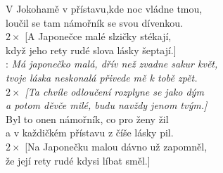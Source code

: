 
V Jokohamě v přístavu,kde noc vládne tmou,\\
loučil se tam námořník se svou dívenkou.\\
$2\times$ [A Japonečce malé slzičky stékají,\\
když jeho rety rudé slova lásky šeptají.]\\

\textregistered: \emph{Má japonečko malá, dřív než zvadne sakur květ,\\
tvoje láska neskonalá přivede mě k tobě zpět.\\
$2\times$ [Ta chvíle odloučení rozplyne se jako dým\\
a potom děvče milé, budu navždy jenom tvým.]}\\

Byl to onen námořník, co pro ženy žil\\
a v každičkém přístavu z číše lásky pil.\\
$2\times$ [Na Japonečku malou dávno už zapomněl,\\
že její rety rudé kdysi líbat směl.]\\

\textregistered

\newpage
